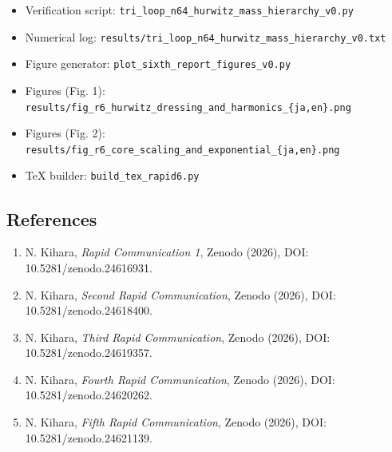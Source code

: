 \documentclass[
  a4paper,
]{article}
\providecommand{\tightlist}{%
  \setlength{\itemsep}{0pt}\setlength{\parskip}{0pt}}
\begin{document}
\begin{itemize}
\tightlist
\item
  Verification script:
  \texttt{tri\_loop\_n64\_hurwitz\_mass\_hierarchy\_v0.py}
\item
  Numerical log:
  \texttt{results/tri\_loop\_n64\_hurwitz\_mass\_hierarchy\_v0.txt}
\item
  Figure generator: \texttt{plot\_sixth\_report\_figures\_v0.py}
\item
  Figures (Fig. 1):
  \texttt{results/fig\_r6\_hurwitz\_dressing\_and\_harmonics\_\{ja,en\}.png}
\item
  Figures (Fig. 2):
  \texttt{results/fig\_r6\_core\_scaling\_and\_exponential\_\{ja,en\}.png}
\item
  TeX builder: \texttt{build\_tex\_rapid6.py}
\end{itemize}

\subsection{References}\label{references}

\begin{enumerate}
\def\labelenumi{\arabic{enumi}.}
\tightlist
\item
  N. Kihara, \emph{Rapid Communication 1}, Zenodo (2026), DOI:
  10.5281/zenodo.24616931.
\item
  N. Kihara, \emph{Second Rapid Communication}, Zenodo (2026), DOI:
  10.5281/zenodo.24618400.
\item
  N. Kihara, \emph{Third Rapid Communication}, Zenodo (2026), DOI:
  10.5281/zenodo.24619357.
\item
  N. Kihara, \emph{Fourth Rapid Communication}, Zenodo (2026), DOI:
  10.5281/zenodo.24620262.
\item
  N. Kihara, \emph{Fifth Rapid Communication}, Zenodo (2026), DOI:
  10.5281/zenodo.24621139.
\end{enumerate}
\end{document}
